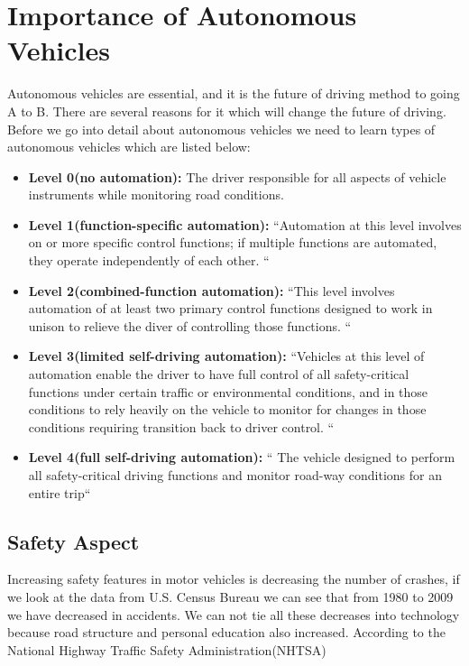 \documentclass{acm_proc_article-sp}
\begin{document}
\section{Importance of Autonomous Vehicles}

Autonomous vehicles are essential, and it is the future of driving method to going A to B. There are several reasons for it which will change the future of driving. Before we go into detail about autonomous vehicles we need to learn types of autonomous vehicles which are listed below: 

\begin{itemize}
    \item \textbf{Level 0(no automation):} The driver responsible for all aspects of vehicle instruments while monitoring road conditions.\cite{hamzah}
    \item \textbf{Level 1(function-specific automation):} ``Automation at this level involves on or more specific control functions; if multiple functions are automated, they operate independently of each other. ``\cite{hamzah}
    \item \textbf{Level 2(combined-function automation):} ``This level involves automation of at least two primary control functions designed to work in unison to relieve the diver of controlling those functions. ``\cite{hamzah}
    \item \textbf{Level 3(limited self-driving automation):} ``Vehicles at this level of automation enable the driver to have full control of all safety-critical functions under certain traffic or environmental conditions, and in those conditions to rely heavily on the vehicle to monitor for changes in those conditions requiring transition back to driver control. ``\cite{hamzah}
    \item \textbf{Level 4(full self-driving automation):} `` The vehicle designed to perform all safety-critical driving functions and monitor road-way conditions for an entire trip``\cite{hamzah}
\end{itemize}

\subsection{Safety Aspect}
Increasing safety features in motor vehicles is decreasing the number of crashes, if we look at the data from U.S. Census Bureau we can see that from 1980 to 2009 we have decreased in accidents. We can not tie all these decreases into technology because road structure and personal education also increased. According to the National Highway Traffic Safety Administration(NHTSA)
 
\end{document}
